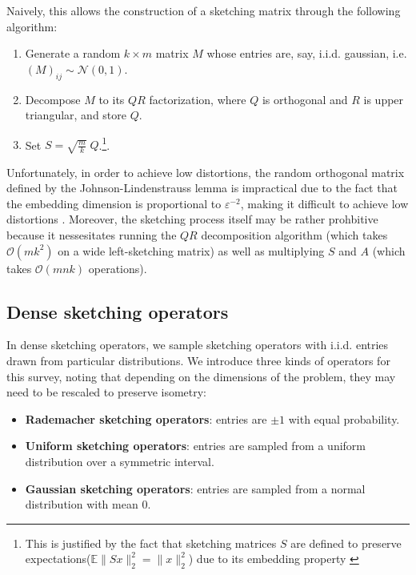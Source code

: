 \documentclass{article}
\newcommand{\bO}{\mathcal{O}}
\begin{document}
Naively, this allows the construction of a sketching matrix through the following algorithm:
\begin{enumerate}
    \item Generate a random $k \times m$ matrix $M$ whose entries are, say, i.i.d. gaussian, i.e. $(M)_{ij} \sim \mathcal{N}(0, 1)$.
    \item Decompose $M$ to its $QR$ factorization, where $Q$ is orthogonal and $R$ is upper triangular, and store $Q$.
    \item  Set $S = \sqrt{\frac mk} \; Q$.\footnote{This is justified by the fact that sketching matrices $S$ are defined to preserve expectations($\mathbb{E} \|Sx\|_2^2 = \|x\|_2^2$) due to its embedding property \cite{Nakatsukasa2024accuraterandomizedalgorithms}}.
\end{enumerate}

Unfortunately, in order to achieve low distortions, the random orthogonal matrix defined by the Johnson-Lindenstrauss lemma is impractical due to the fact that the embedding dimension is proportional to $\varepsilon^{-2}$, making it difficult to achieve low distortions \cite{martinsson2021randomizednumericallinearalgebra}. Moreover, the sketching process itself may be rather prohbitive because it nessesitates running the $QR$ decomposition algorithm (which takes $\bO(mk^2)$ on a wide left-sketching matrix) as well as multiplying $S$ and $A$ (which takes $\bO(mnk)$ operations).


\subsection{Dense sketching operators}
\label{sec:Dense sketching operators}
In dense sketching operators, we sample sketching operators with i.i.d. entries drawn from particular distributions. We introduce three kinds of operators for this survey, noting that depending on the dimensions of the problem, they may need to be rescaled to preserve isometry: 
\begin{itemize}
   \item \textbf{Rademacher sketching operators}: entries are $\pm 1$ with equal probability.
    \item \textbf{Uniform sketching operators}: entries are sampled from a uniform distribution over a symmetric interval.
    \item \textbf{Gaussian sketching operators}: entries are sampled from a normal distribution with mean $0$.
\end{itemize}
\end{document}
